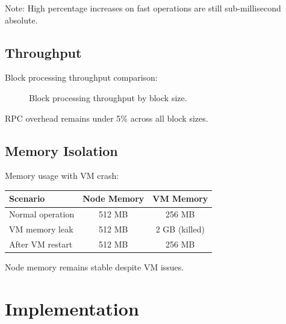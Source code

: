 \documentclass[11pt,letterpaper]{article}
\begin{document}
Note: High percentage increases on fast operations are still sub-millisecond absolute.

\subsection{Throughput}

Block processing throughput comparison:

\begin{figure}[h]
\centering
{}
\caption{Block processing throughput by block size.}
\label{fig:throughput}
\end{figure}

RPC overhead remains under 5\% across all block sizes.

\subsection{Memory Isolation}

Memory usage with VM crash:

\begin{center}
\begin{tabular}{lcc}
\toprule
\textbf{Scenario} & \textbf{Node Memory} & \textbf{VM Memory} \\
\midrule
Normal operation & 512 MB & 256 MB \\
VM memory leak & 512 MB & 2 GB (killed) \\
After VM restart & 512 MB & 256 MB \\
\bottomrule
\end{tabular}
\end{center}

Node memory remains stable despite VM issues.

\section{Implementation}
\end{document}
